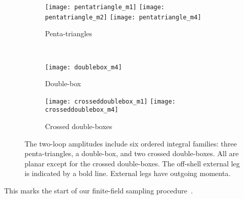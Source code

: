 \documentclass[main.tex]{subfiles}
\begin{document}
\begin{figure}
    \begin{center}
        \begin{subfigure}[c]{\linewidth}
            \centering
            \texttt{[image: pentatriangle\_m1]}
            \texttt{[image: pentatriangle\_m2]}
            \texttt{[image: pentatriangle\_m4]}
            \caption{Penta-triangles}
            \label{fig:pentatriangle}
        \end{subfigure}
        \\
        \vspace{1em}
        \begin{subfigure}[c]{0.3\linewidth}
            \centering
            \texttt{[image: doublebox\_m4]}
            \caption{Double-box}
            \label{fig:double-box}
        \end{subfigure}
        \begin{subfigure}[c]{0.6\linewidth}
            \centering
            \texttt{[image: crosseddoublebox\_m1]}
            \texttt{[image: crosseddoublebox\_m4]}
            \caption{Crossed double-boxes}
            \label{fig:crosseddouble-box}
        \end{subfigure}
    \end{center}
    \caption{ 
        The two-loop amplitudes include six ordered integral families: three penta-triangles, a double-box, and two crossed double-boxes.
        All are planar except for the crossed double-boxes.
        The off-shell external leg is indicated by a bold line.
        External legs have outgoing momenta.
    }
    \label{fig:int-fams}
\end{figure}
This marks the start of our finite-field sampling
procedure~\cite{Peraro:2016wsq}. 
\end{document}
